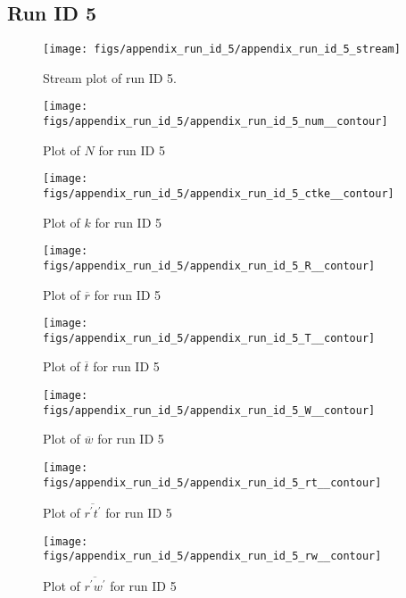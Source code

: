 \subsection{Run ID 5}
\begin{figure}[H]
\centering
\texttt{[image: figs/appendix\_run\_id\_5/appendix\_run\_id\_5\_stream]}
\caption{Stream plot of run ID 5.}
\label{fig:appendix_run_id_5_stream}
\end{figure}


\begin{figure}[H]
\centering
\texttt{[image: figs/appendix\_run\_id\_5/appendix\_run\_id\_5\_num\_\_contour]}
\caption{Plot of $N$ for run ID 5}
\label{fig:appendix_run_id_5_num__contour}
\end{figure}


\begin{figure}[H]
\centering
\texttt{[image: figs/appendix\_run\_id\_5/appendix\_run\_id\_5\_ctke\_\_contour]}
\caption{Plot of $k$ for run ID 5}
\label{fig:appendix_run_id_5_ctke__contour}
\end{figure}


\begin{figure}[H]
\centering
\texttt{[image: figs/appendix\_run\_id\_5/appendix\_run\_id\_5\_R\_\_contour]}
\caption{Plot of $\overline{r}$ for run ID 5}
\label{fig:appendix_run_id_5_R__contour}
\end{figure}


\begin{figure}[H]
\centering
\texttt{[image: figs/appendix\_run\_id\_5/appendix\_run\_id\_5\_T\_\_contour]}
\caption{Plot of $\overline{t}$ for run ID 5}
\label{fig:appendix_run_id_5_T__contour}
\end{figure}


\begin{figure}[H]
\centering
\texttt{[image: figs/appendix\_run\_id\_5/appendix\_run\_id\_5\_W\_\_contour]}
\caption{Plot of $\overline{w}$ for run ID 5}
\label{fig:appendix_run_id_5_W__contour}
\end{figure}


\begin{figure}[H]
\centering
\texttt{[image: figs/appendix\_run\_id\_5/appendix\_run\_id\_5\_rt\_\_contour]}
\caption{Plot of $\overline{r^\prime t^\prime}$ for run ID 5}
\label{fig:appendix_run_id_5_rt__contour}
\end{figure}


\begin{figure}[H]
\centering
\texttt{[image: figs/appendix\_run\_id\_5/appendix\_run\_id\_5\_rw\_\_contour]}
\caption{Plot of $\overline{r^\prime w^\prime}$ for run ID 5}
\label{fig:appendix_run_id_5_rw__contour}
\end{figure}


